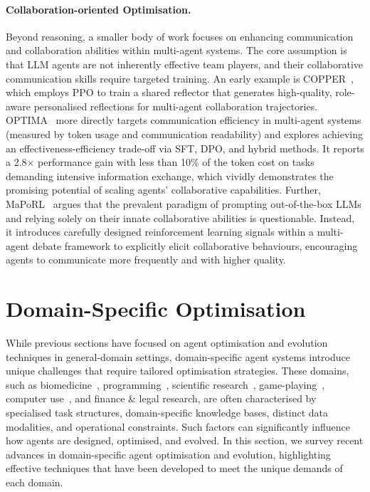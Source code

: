 \documentclass[]{selfevolagent}
\theoremstyle{plain}
\theoremstyle{definition}
\theoremstyle{remark}
\begin{document}
\paragraph{{Collaboration-oriented Optimisation.}} Beyond reasoning, a smaller body of work focuses on enhancing communication and collaboration abilities within multi-agent systems. The core assumption is that LLM agents are not inherently effective team players, and their collaborative communication skills require targeted training. An early example is COPPER~\citep{bo2024reflective}, which employs PPO to train a shared reflector that generates high-quality, role-aware personalised reflections for multi-agent collaboration trajectories. OPTIMA~\citep{chen2024optima} more directly targets communication efficiency in multi-agent systems (measured by token usage and communication readability) and explores achieving an effectiveness-efficiency trade-off via SFT, DPO, and hybrid methods. It reports a 2.8× performance gain with less than 10\% of the token cost on tasks demanding intensive information exchange, which vividly demonstrates the promising potential of scaling agents' collaborative capabilities. Further, MaPoRL~\citep{park2025maporl} argues that the prevalent paradigm of prompting out-of-the-box LLMs and relying solely on their innate collaborative abilities is questionable. Instead, it introduces carefully designed reinforcement learning signals within a multi-agent debate framework to explicitly elicit collaborative behaviours, encouraging agents to communicate more frequently and with higher quality. 

\section{Domain-Specific Optimisation}
\label{sec:domain-specific_optimisation}

While previous sections have focused on agent optimisation and evolution techniques in general-domain settings, domain-specific agent systems introduce unique challenges that require tailored optimisation strategies. These domains, such as biomedicine~\citep{almansoori2025self}, programming~\citep{tang2024codeagent}, scientific research~\citep{pu2025piflow}, game-playing~\citep{belle2025agents}, computer use~\citep{sun2025seagent}, and finance \& legal research, are often characterised by specialised task structures, domain-specific knowledge bases, distinct data modalities, and operational constraints. Such factors can significantly influence how agents are designed, optimised, and evolved. In this section, we survey recent advances in domain-specific agent optimisation and evolution, highlighting effective techniques that have been developed to meet the unique demands of each domain.
\end{document}
